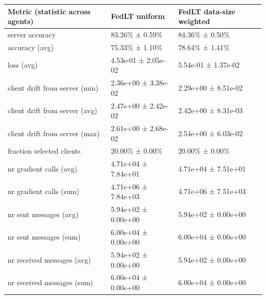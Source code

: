 \begin{tabular}{lll}
\hline
 Metric (statistic across agents)   & FedLT uniform       & FedLT data-size weighted   \\
\hline
 server accuracy                    & 83.26\% ± 0.59\%      & 84.36\% ± 0.50\%             \\
 accuracy (avg)                     & 75.33\% ± 1.10\%      & 78.64\% ± 1.41\%             \\
 loss (avg)                         & 4.53e-01 ± 2.05e-02 & 5.54e-01 ± 1.37e-02        \\
 client drift from server (min)     & 2.36e+00 ± 3.38e-02 & 2.29e+00 ± 8.51e-02        \\
 client drift from server (avg)     & 2.47e+00 ± 2.42e-02 & 2.42e+00 ± 8.31e-03        \\
 client drift from server (max)     & 2.61e+00 ± 2.68e-02 & 2.54e+00 ± 6.03e-02        \\
 fraction selected clients          & 20.00\% ± 0.00\%      & 20.00\% ± 0.00\%             \\
 nr gradient calls (avg)            & 4.71e+04 ± 7.84e+01 & 4.71e+04 ± 7.51e+01        \\
 nr gradient calls (sum)            & 4.71e+06 ± 7.84e+03 & 4.71e+06 ± 7.51e+03        \\
 nr sent messages (avg)             & 5.94e+02 ± 0.00e+00 & 5.94e+02 ± 0.00e+00        \\
 nr sent messages (sum)             & 6.00e+04 ± 0.00e+00 & 6.00e+04 ± 0.00e+00        \\
 nr received messages (avg)         & 5.94e+02 ± 0.00e+00 & 5.94e+02 ± 0.00e+00        \\
 nr received messages (sum)         & 6.00e+04 ± 0.00e+00 & 6.00e+04 ± 0.00e+00        \\
\hline
\end{tabular}